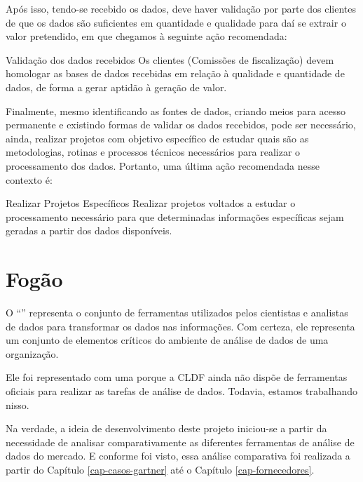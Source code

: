     Após isso, tendo-se recebido os dados, deve haver validação por parte dos clientes de que os dados são suficientes em quantidade e qualidade para daí se extrair o valor pretendido, em que chegamos à seguinte ação recomendada:
    
    \begin{env-proposta}{Validação dos dados recebidos}
        \nohyphens{Os clientes (Comissões de fiscalização) devem homologar as bases de dados recebidas em relação à qualidade e quantidade de dados, de forma a gerar aptidão à geração de valor.}
    \end{env-proposta}

    Finalmente, mesmo identificando as fontes de dados, criando meios para acesso permanente e existindo formas de validar os dados recebidos, pode ser necessário, ainda, realizar projetos com objetivo específico de estudar quais são as metodologias, rotinas e processos técnicos necessários para realizar o processamento dos dados. Portanto, uma última ação recomendada nesse contexto é:
    
    \begin{env-proposta}{Realizar Projetos Específicos}
        \nohyphens{Realizar projetos voltados a estudar o processamento necessário para que determinadas informações específicas sejam geradas a partir dos dados disponíveis.}
    \end{env-proposta}
    \section{Fogão}
    
    O ``'' representa o conjunto de ferramentas utilizados pelos cientistas e analistas de dados para transformar os dados nas informações. Com certeza, ele representa um conjunto de elementos críticos do ambiente de análise de dados de uma organização. 

    \begin{env-cenario2}{}
        \mscheckint \xspace \FOGAO
    \end{env-cenario2}  
    
    Ele foi representado com uma \mscheckint \xspace porque a CLDF ainda não dispõe de ferramentas oficiais para realizar as tarefas de análise de dados. Todavia, estamos trabalhando nisso.
    
    Na verdade, a ideia de desenvolvimento deste projeto iniciou-se a partir da necessidade de analisar comparativamente as diferentes ferramentas de análise de dados do mercado. E conforme foi visto, essa análise comparativa foi realizada a partir do Capítulo \ref{cap-casos-gartner} até o Capítulo \ref{cap-fornecedores}. 
    
